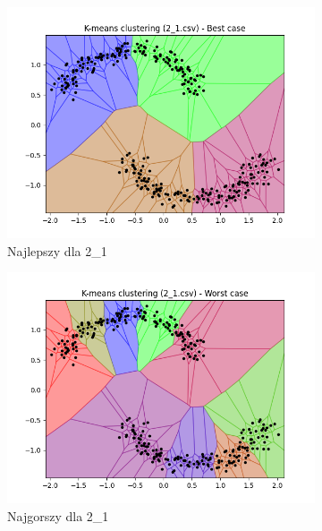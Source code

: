 \documentclass[12pt]{article}
\begin{document}
\begin{figure}[H]
\begin{subfigure}[b]{0.24\textwidth}
        \includegraphics[width=\linewidth]{img/exp_1/kmeans/2_1_best.png}
        \caption{Najlepszy dla 2\_1}
    \end{subfigure}
    \hfill
    \begin{subfigure}[b]{0.24\textwidth}
        \includegraphics[width=\linewidth]{img/exp_1/kmeans/2_1_worst.png}
        \caption{Najgorszy dla 2\_1}
    \end{subfigure}
    \begin{subfigure}[b]{0.24\textwidth}

\end{subfigure}
\end{figure}
\end{document}
